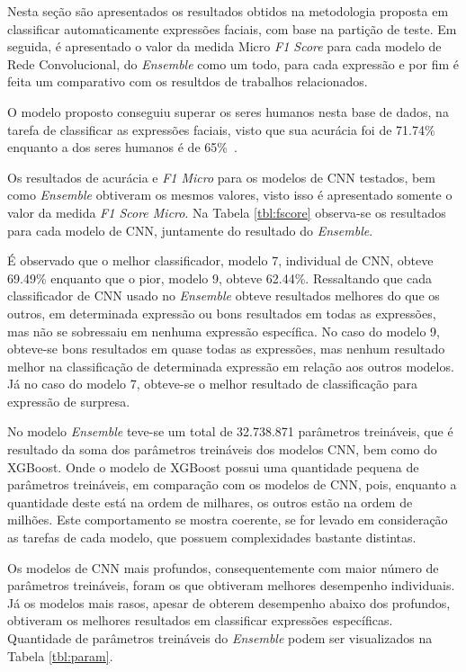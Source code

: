 Nesta seção são apresentados os resultados obtidos na metodologia proposta em classificar automaticamente expressões faciais, com base na partição de teste. Em seguida, é apresentado o valor da medida Micro \textit{F1 Score} para cada modelo de Rede Convolucional, do \textit{Ensemble} como um todo, para cada expressão e por fim  é feita um comparativo com os resultdos de trabalhos relacionados. 

O modelo proposto conseguiu superar os seres humanos nesta base de dados, na tarefa de classificar as expressões faciais, visto que sua acurácia foi de 71.74\%\, enquanto a dos seres humanos é de 65\%\ \cite{goodfellow2013challenges}.

Os resultados de acurácia e \emph{F1 Micro} para os modelos de CNN testados, bem como \emph{Ensemble} obtiveram os mesmos valores, visto isso é apresentado somente o valor da medida \emph{F1 Score Micro}. Na Tabela \ref{tbl:fscore} observa-se os resultados para cada modelo de CNN, juntamente do resultado do \emph{Ensemble}.



É observado que o melhor classificador, modelo 7, individual de CNN, obteve 69.49\% enquanto que o pior, modelo 9, obteve 62.44\%. Ressaltando que cada classificador de CNN usado no \emph{Ensemble} obteve resultados melhores do que os outros, em determinada expressão ou bons resultados em todas as expressões, mas não se sobressaiu em nenhuma expressão específica. No caso do modelo 9, obteve-se bons resultados em quase todas as expressões, mas nenhum resultado melhor na classificação de determinada expressão em relação aos outros modelos. Já no caso do modelo 7, obteve-se o melhor resultado de classificação para expressão de surpresa.

No modelo \textit{Ensemble} teve-se um total de 32.738.871 parâmetros treináveis, que é resultado da soma dos parâmetros treináveis dos modelos CNN, bem como do XGBoost. Onde o modelo de XGBoost possui uma quantidade pequena de parâmetros treináveis, em comparação com os modelos de CNN, pois, enquanto a quantidade deste está na ordem de milhares, os outros estão na ordem de milhões. Este comportamento se mostra coerente, se for levado em consideração as tarefas de cada modelo, que possuem complexidades bastante distintas.



Os modelos de CNN mais profundos, consequentemente com maior número de parâmetros treináveis, foram os que obtiveram melhores desempenho individuais. Já os modelos mais rasos, apesar de obterem desempenho abaixo dos profundos, obtiveram os melhores resultados em classificar expressões específicas. Quantidade de parâmetros treináveis do \textit{Ensemble} podem ser visualizados na Tabela \ref{tbl:param}.

